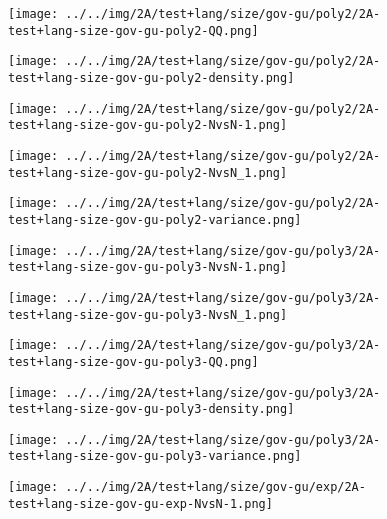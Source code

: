 \begin{figure}[H]
\centering	\texttt{[image: ../../img/2A/test+lang/size/gov-gu/poly2/2A-test+lang-size-gov-gu-poly2-QQ.png]}
\end{figure}
\begin{figure}[H]
\centering	\texttt{[image: ../../img/2A/test+lang/size/gov-gu/poly2/2A-test+lang-size-gov-gu-poly2-density.png]}
\end{figure}
\begin{figure}[H]
\centering	\texttt{[image: ../../img/2A/test+lang/size/gov-gu/poly2/2A-test+lang-size-gov-gu-poly2-NvsN-1.png]}
\end{figure}
\begin{figure}[H]
\centering	\texttt{[image: ../../img/2A/test+lang/size/gov-gu/poly2/2A-test+lang-size-gov-gu-poly2-NvsN\_1.png]}
\end{figure}
\begin{figure}[H]
\centering	\texttt{[image: ../../img/2A/test+lang/size/gov-gu/poly2/2A-test+lang-size-gov-gu-poly2-variance.png]}
\end{figure}
\begin{figure}[H]
\centering	\texttt{[image: ../../img/2A/test+lang/size/gov-gu/poly3/2A-test+lang-size-gov-gu-poly3-NvsN-1.png]}
\end{figure}
\begin{figure}[H]
\centering	\texttt{[image: ../../img/2A/test+lang/size/gov-gu/poly3/2A-test+lang-size-gov-gu-poly3-NvsN\_1.png]}
\end{figure}
\begin{figure}[H]
\centering	\texttt{[image: ../../img/2A/test+lang/size/gov-gu/poly3/2A-test+lang-size-gov-gu-poly3-QQ.png]}
\end{figure}
\begin{figure}[H]
\centering	\texttt{[image: ../../img/2A/test+lang/size/gov-gu/poly3/2A-test+lang-size-gov-gu-poly3-density.png]}
\end{figure}
\begin{figure}[H]
\centering	\texttt{[image: ../../img/2A/test+lang/size/gov-gu/poly3/2A-test+lang-size-gov-gu-poly3-variance.png]}
\end{figure}
\begin{figure}[H]
\centering	\texttt{[image: ../../img/2A/test+lang/size/gov-gu/exp/2A-test+lang-size-gov-gu-exp-NvsN-1.png]}
\end{figure}
